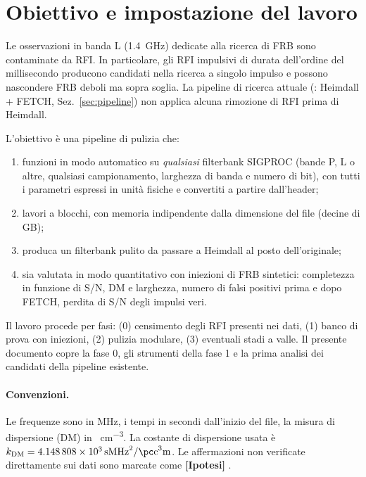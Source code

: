 \documentclass[11pt,a4paper]{article}
\newcommand{\dmu}{\si{\pc\per\cubic\centi\metre}}
\DeclareRobustCommand{\file}[1]{\texttt{\detokenize{#1}}}
\newcommand{\ipotesi}[1]{\textcolor{orange!70!black}{\textbf{[Ipotesi]}} #1}
\begin{document}
\tableofcontents
\clearpage

\FloatBarrier
\section{Obiettivo e impostazione del lavoro}
\label{sec:intro}

Le osservazioni in banda L (\SI{1.4}{\giga\hertz}) dedicate alla ricerca di FRB sono contaminate da RFI.
In particolare, gli RFI impulsivi di durata dell'ordine del millisecondo producono candidati nella ricerca
a singolo impulso e possono nascondere FRB deboli ma sopra soglia. La pipeline di ricerca attuale
(\file{FRB_HF_Finder.py}: Heimdall + FETCH, Sez.~\ref{sec:pipeline}) non applica alcuna rimozione di RFI prima
di Heimdall.

L'obiettivo è una pipeline di pulizia che:
\begin{enumerate}
  \item funzioni in modo automatico su \emph{qualsiasi} filterbank SIGPROC (bande P, L o altre, qualsiasi
        campionamento, larghezza di banda e numero di bit), con tutti i parametri espressi in unità fisiche
        e convertiti a partire dall'header;
  \item lavori a blocchi, con memoria indipendente dalla dimensione del file (decine di GB);
  \item produca un filterbank pulito da passare a Heimdall al posto dell'originale;
  \item sia valutata in modo quantitativo con iniezioni di FRB sintetici: completezza in funzione di
        S/N, DM e larghezza, numero di falsi positivi prima e dopo FETCH, perdita di S/N degli impulsi veri.
\end{enumerate}

Il lavoro procede per fasi: (0) censimento degli RFI presenti nei dati, (1) banco di prova con iniezioni,
(2) pulizia modulare, (3) eventuali stadi a valle. Il presente documento copre la fase 0, gli strumenti della
fase 1 e la prima analisi dei candidati della pipeline esistente.

\paragraph{Convenzioni.} Le frequenze sono in MHz, i tempi in secondi dall'inizio del file, la misura di
dispersione (DM) in \dmu. La costante di dispersione usata è $k_{\rm DM}=\SI{4.148808e3}{\second\mega\hertz\squared\per\pc\cubic\centi\metre}$.
Le affermazioni non verificate direttamente sui dati sono marcate come \ipotesi{}.
\end{document}
